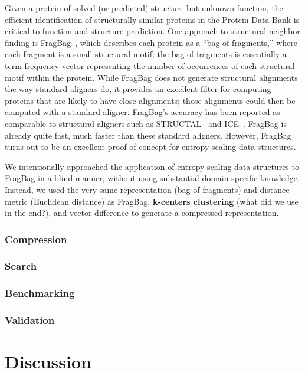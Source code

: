 \documentclass{amsbook}
\theoremstyle{definition}
\theoremstyle{remark}
\numberwithin{equation}{section}
\begin{document}
Given a protein of solved (or predicted) structure but unknown function, the efficient identification
of structurally similar proteins in the Protein Data Bank is critical to function and structure prediction.
One approach to structural neighbor finding is FragBag~\cite{budowski}, which describes each protein as a
``bag of fragments,'' where each fragment is a small structural motif; the bag of fragments is essentially
a term frequency vector representing the number of occurrences of each structural motif within the protein.
While FragBag does not generate structural alignments the way standard aligners do, it provides an excellent
filter for computing proteins that are likely to have close alignments; those alignments could then be computed
with a standard aligner.
FragBag's accuracy has been reported as comparable to structural aligners such as STRUCTAL~\cite{blah} and
ICE~\cite{blah}.
FragBag is already quite fast, much faster than these standard aligners.
However, FragBag turns out to be an excellent proof-of-concept for entropy-scaling data structures.

We intentionally approached the application of entropy-scaling data structures to FragBag in a blind manner,
without using substantial domain-specific knowledge.
Instead, we used the very same representation (bag of fragments) and distance metric (Euclidean distance)
as FragBag, \textbf{k-centers clustering} (what did we use in the end?), and vector difference to generate a
compressed representation.

\subsection*{Compression}

\subsection*{Search}

\subsection*{Benchmarking}

\subsection*{Validation}

\chapter*{Discussion}
\end{document}

